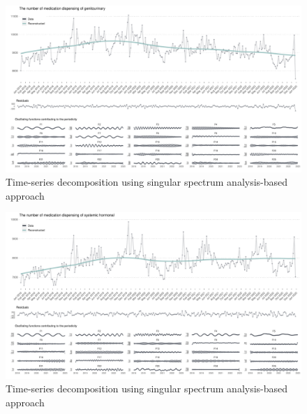 \documentclass[
  letterpaper,
  DIV=11,
  numbers=noendperiod]{scrartcl}
\begin{document}
\begin{figure}[H]

{\centering \includegraphics[width=1\linewidth,height=\textheight,keepaspectratio]{supplementary_files/figure-pdf/unnamed-chunk-2-5.pdf}

}

\caption{Time-series decomposition using singular spectrum
analysis-based approach}

\end{figure}%

\begin{figure}[H]

{\centering \includegraphics[width=1\linewidth,height=\textheight,keepaspectratio]{supplementary_files/figure-pdf/unnamed-chunk-2-6.pdf}

}

\caption{Time-series decomposition using singular spectrum
analysis-based approach}

\end{figure}%
\end{document}
